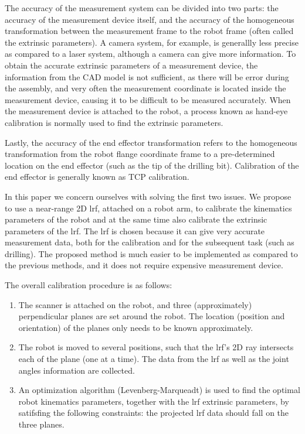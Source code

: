 The accuracy of the measurement system can be divided into two parts: the accuracy of the measurement device itself, and the accuracy of the homogeneous transformation between the measurement frame to the robot frame (often called the extrinsic parameters). A camera system, for example, is generallly less precise as compared to a laser system, although a camera can give more information. To obtain the accurate extrinsic parameters of a measurement device, the information from the CAD model is not sufficient, as there will be error during the assembly, and very often the measurement coordinate is located inside the measurement device, causing it to be difficult to be measured accurately. When the measurement device is attached to the robot, a process known as hand-eye calibration is normally used to find the extrinsic parameters. 

Lastly, the accuracy of the end effector transformation refers to the homogeneous transformation from the robot flange coordinate frame to a pre-determined location on the end effector (such as the tip of the drilling bit). Calibration of the end effector is generally known as TCP calibration. 

In this paper we concern ourselves with solving the first two issues. We propose to use a near-range 2D \ac{lrf}, attached on a robot arm, to calibrate the kinematics parameters of the robot and at the same time also calibrate the extrinsic parameters of the \ac{lrf}. The \ac{lrf} is chosen because it can give very accurate measurement data, both for the calibration and for the subsequent task (such as drilling). The proposed method is much easier to be implemented as compared to the previous methods, and it does not require expensive measurement device. 

The overall calibration procedure is as follows:
\begin{enumerate}
\item The scanner is attached on the robot, and three (approximately) perpendicular planes are set around the robot. The location (position and orientation) of the planes only needs to be known approximately.
\item The robot is moved to several positions, such that the \ac{lrf}'s 2D ray intersects each of the plane (one at a time). The data from the \ac{lrf} as well as the joint angles information are collected.
\item An optimization algorithm (Levenberg-Marqueadt) is used to find the optimal robot kinematics parameters, together with the \ac{lrf} extrinsic parameters, by satifsfing the following constraints: the projected \ac{lrf} data should fall on the three planes. 
\end{enumerate}

